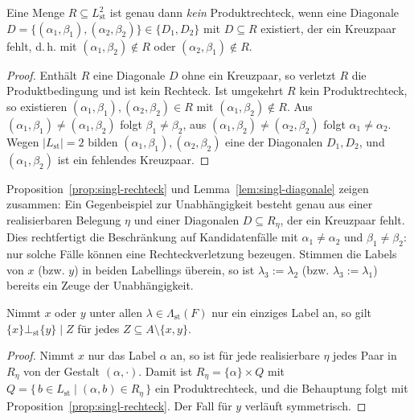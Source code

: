 \begin{Lemma}
    \label{lem:singl-diagonale}
    Eine Menge \(R\subseteq L_{\mathrm{st}}^2\) ist genau dann \emph{kein}
    Produktrechteck, wenn eine Diagonale
    \(D=\{(\alpha_1,\beta_1),(\alpha_2,\beta_2)\}\in\{D_1,D_2\}\) mit
    \(D\subseteq R\) existiert, der ein Kreuzpaar fehlt, d.\,h. mit
    \((\alpha_1,\beta_2)\notin R\) oder \((\alpha_2,\beta_1)\notin R\).
\end{Lemma}

\begin{proof}
    \label{pr:singl-diagonale}
    Enthält \(R\) eine Diagonale \(D\) ohne ein Kreuzpaar, so verletzt \(R\)
    die Produktbedingung und ist kein Rechteck. Ist umgekehrt \(R\) kein
    Produktrechteck, so existieren
    \((\alpha_1,\beta_1),(\alpha_2,\beta_2)\in R\) mit
    \((\alpha_1,\beta_2)\notin R\). Aus
    \((\alpha_1,\beta_1)\neq(\alpha_1,\beta_2)\) folgt \(\beta_1\neq\beta_2\),
    aus \((\alpha_1,\beta_2)\neq(\alpha_2,\beta_2)\) folgt
    \(\alpha_1\neq\alpha_2\). Wegen \(|L_{\mathrm{st}}|=2\) bilden
    \((\alpha_1,\beta_1),(\alpha_2,\beta_2)\) eine der Diagonalen
    \(D_1,D_2\), und \((\alpha_1,\beta_2)\) ist ein fehlendes Kreuzpaar.
\end{proof}

Proposition~\ref{prop:singl-rechteck} und Lemma~\ref{lem:singl-diagonale}
zeigen zusammen: Ein Gegenbeispiel zur Unabhängigkeit besteht genau aus einer
realisierbaren Belegung \(\eta\) und einer Diagonalen \(D\subseteq R_\eta\),
der ein Kreuzpaar fehlt. Dies rechtfertigt die Beschränkung auf
Kandidatenfälle mit \(\alpha_1\neq\alpha_2\) und \(\beta_1\neq\beta_2\): nur
solche Fälle können eine Rechteckverletzung bezeugen. Stimmen die Labels von
\(x\) (bzw. \(y\)) in beiden Labellings überein, so ist \(\lambda_3:=\lambda_2\)
(bzw. \(\lambda_3:=\lambda_1\)) bereits ein Zeuge der Unabhängigkeit.

\begin{Corollary}
    \label{cor:singl-fixlabel}
    Nimmt \(x\) oder \(y\) unter allen \(\lambda\in\Lambda_{\mathrm{st}}(F)\)
    nur ein einziges Label an, so gilt \(\{x\}\bot_{\mathrm{st}}\{y\}\mid Z\)
    für jedes \(Z\subseteq A\setminus\{x,y\}\).
\end{Corollary}

\begin{proof}
    \label{pr:singl-fixlabel}
    Nimmt \(x\) nur das Label \(\alpha\) an, so ist für jede realisierbare
    \(\eta\) jedes Paar in \(R_\eta\) von der Gestalt \((\alpha,\cdot)\). Damit
    ist \(R_\eta=\{\alpha\}\times Q\) mit
    \(Q=\{\,b\in L_{\mathrm{st}}\mid(\alpha,b)\in R_\eta\,\}\) ein
    Produktrechteck, und die Behauptung folgt mit
    Proposition~\ref{prop:singl-rechteck}. Der Fall für \(y\) verläuft
    symmetrisch.
\end{proof}


